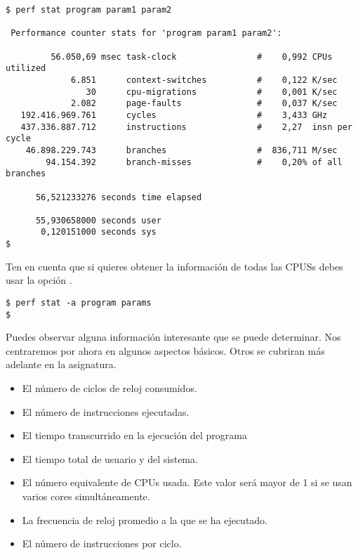 \begin{lstlisting}[style=terminal,basicstyle=\ttfamily]
$ perf stat program param1 param2

 Performance counter stats for 'program param1 param2':

         56.050,69 msec task-clock                #    0,992 CPUs utilized          
             6.851      context-switches          #    0,122 K/sec                  
                30      cpu-migrations            #    0,001 K/sec                  
             2.082      page-faults               #    0,037 K/sec                  
   192.416.969.761      cycles                    #    3,433 GHz                    
   437.336.887.712      instructions              #    2,27  insn per cycle         
    46.898.229.743      branches                  #  836,711 M/sec                  
        94.154.392      branch-misses             #    0,20% of all branches        

      56,521233276 seconds time elapsed

      55,930658000 seconds user
       0,120151000 seconds sys
$
\end{lstlisting}

Ten en cuenta que si quieres obtener la información de todas las CPUSs
debes usar la opción .

\begin{lstlisting}[style=terminal]
$ perf stat -a program params
$
\end{lstlisting}

Puedes observar alguna información interesante que se puede determinar.
Nos centraremos por ahora en algunos aspectos básicos. Otros se
cubriran más adelante en la asignatura.

\begin{itemize}
  \item El número de ciclos de reloj consumidos.
  \item El número de instrucciones ejecutadas.
  \item El tiempo transcurrido en la ejecución del programa
  \item El tiempo total de usuario y del sistema.
  \item El número equivalente de CPUs usada. Este valor será mayor de 1 si
        se usan varios cores simultáneamente.
  \item La frecuencia de reloj promedio a la que se ha ejecutado.
  \item El número de instrucciones por ciclo.
\end{itemize}


